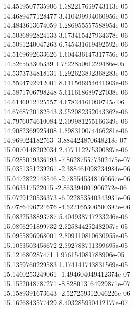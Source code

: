 {14.4519507735906 1.382217669743113e-05
 \\
14.4689477128477 3.410499994060956e-05
 \\
14.4843613674059 1.286955557588954e-05
 \\
14.5036892824133 3.073415427934378e-06
 \\
14.5091240047263 6.745431619492592e-06
 \\
14.5169692633626 1.604436147317756e-05
 \\
14.526553305339 1.752285061229486e-05
 \\
14.5373734818131 1.292623892368283e-05
 \\
14.5594792912001 8.611566954641603e-06
 \\
14.5871706798248 5.611618689727038e-06
 \\
14.6146912125557 4.67834161099745e-06
 \\
14.6768720182543 3.952082352043362e-06
 \\
14.7976074610084 2.309981255166349e-06
 \\
14.9082369925408 1.898310074466281e-06
 \\
14.969024182763 -3.884424870648218e-07
 \\
15.0070148202034 2.477112275300897e-06
 \\
15.0285019336193 -7.862875577302475e-07
 \\
15.0351351239261 -2.388461098234984e-06
 \\
15.0472822148546 -2.785545348160667e-06
 \\
15.063317522015 -2.863394001906272e-06
 \\
15.0729120536373 -6.022853540343931e-06
 \\
15.0786496721676 -4.622165306500392e-06
 \\
15.0832538893787 5.404938747233246e-06
 \\
15.0896291899732 2.325844252482057e-05
 \\
15.0955896968001 2.809110810630955e-05
 \\
15.1053503456672 2.392788701399695e-05
 \\
15.121680287471 1.976154089788906e-05
 \\
15.1359760229583 1.174141743831569e-05
 \\
15.1460253249061 -1.494604049412374e-07
 \\
15.1552048787271 -8.828013164929871e-07
 \\
15.1589391673643 -2.527259312046226e-06
 \\
15.1626843577429 8.403285960412177e-07
}
